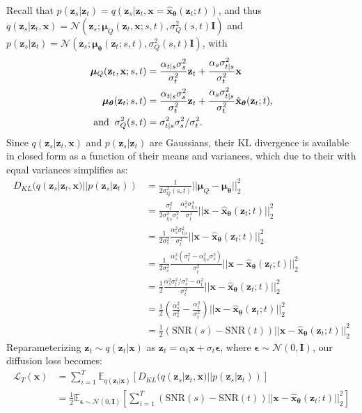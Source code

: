 \documentclass{article}
\def\rvx{{\mathbf{x}}}
\def\rvz{{\mathbf{z}}}
\newcommand{\E}{\mathbb{E}}
\newcommand{\bT}{{\boldsymbol{\theta}}}
\newcommand{\bfI}{\mathbf{I}}
\newcommand{\bepsilon}{{\boldsymbol{\epsilon}}}
\newcommand{\bmu}{{\boldsymbol{\mu}}}
\newcommand{\snr}{\text{SNR}}
\begin{document}
Recall that $p(\rvz_s|\rvz_t) = q(\rvz_s|\rvz_t, \rvx=\hat{\rvx}_{\bT}(\rvz_t; t))$, and thus $q(\rvz_s|\rvz_t,\rvx) = \mathcal{N}(\rvz_s; \bmu_{Q}(\rvz_{t}, \rvx; s,t), \sigma^2_Q(s,t) \bfI)$ and $p(\rvz_s|\rvz_t) = \mathcal{N}(\rvz_s; \bmu_{\bT}(\rvz_{t}; s, t), \sigma^2_Q(s,t) \bfI)$, with
\begin{align}
\bmu_{Q}(\rvz_t, \rvx; s, t) &= \frac{\alpha_{t|s}\sigma^{2}_s}{\sigma^{2}_t}\rvz_{t} + \frac{\alpha_s \sigma^{2}_{t|s}}{\sigma^{2}_{t}}\rvx\\
\bmu_{\bT}(\rvz_t; s, t) &= \frac{\alpha_{t|s}\sigma^{2}_s}{\sigma^{2}_t}\rvz_{t} + \frac{\alpha_s \sigma^{2}_{t|s}}{\sigma^{2}_{t}}\hat{\rvx}_{\bT}(\rvz_t; t),\\
\text{and\;\;} \sigma^2_Q(s,t) &= \sigma^2_{t|s}\sigma^2_s / \sigma^2_t.
\end{align}
Since $q(\rvz_s|\rvz_t,\rvx)$ and $p(\rvz_s|\rvz_t)$ are Gaussians, their KL divergence is available in closed form as a function of their means and variances, which due to their with equal variances simplifies as:
\begin{align}
D_{KL}(q(\rvz_s|\rvz_t,\rvx)||p(\rvz_s|\rvz_t)) 
&= \frac{1}{2\sigma^2_Q(s,t)}
||\bmu_Q - \bmu_\bT||_2^2
\label{eq:KL_DPM}
\\
&= 
\frac{\sigma^2_t}{2\sigma^2_{t|s}\sigma^2_s}
\frac{\alpha_s^{2} \sigma^{4}_{t|s}}{\sigma^{4}_{t}}
||\rvx - \hat{\rvx}_{\bT}(\rvz_t; t)||_2^2\\
&= 
\frac{1}{2\sigma^2_s}
\frac{\alpha_s^{2} \sigma^{2}_{t|s}}{\sigma^{2}_{t}}
||\rvx - \hat{\rvx}_{\bT}(\rvz_t; t)||_2^2\\
&= 
\frac{1}{2\sigma^2_s}
\frac{\alpha_s^{2}(\sigma^{2}_t - \alpha_{t|s}^{2}\sigma^{2}_s)}{\sigma^{2}_{t}}
||\rvx - \hat{\rvx}_{\bT}(\rvz_t; t)||_2^2\\
&= 
\frac{1}{2}
\frac{\alpha_s^{2}\sigma^{2}_t/\sigma^2_s - \alpha_{t}^{2}}{\sigma^{2}_{t}}
||\rvx - \hat{\rvx}_{\bT}(\rvz_t; t)||_2^2\\
&= 
\frac{1}{2}\left(
\frac{\alpha_s^{2}}{\sigma^2_s} - \frac{\alpha_t^{2}}{\sigma^{2}_t}\right)
||\rvx - \hat{\rvx}_{\bT}(\rvz_t; t)||_2^2\\
&= 
\frac{1}{2}\left(
\snr(s) - \snr(t)\right)
||\rvx - \hat{\rvx}_{\bT}(\rvz_t; t)||_2^2
\end{align}
Reparameterizing $\rvz_t \sim q(\rvz_t|\rvx)$ as $\rvz_t = \alpha_t \rvx + \sigma_t \bepsilon$, where $\bepsilon \sim \mathcal{N}(0,\bfI)$, our diffusion loss becomes:
\begin{align}
\mathcal{L}_T(\rvx) &= \sum_{i=1}^T \E_{q(\rvz_t|\rvx)}[ D_{KL}(q(\rvz_s|\rvz_t,\rvx)||p(\rvz_s|\rvz_t))]\\
&= \frac{1}{2}\E_{\bepsilon \sim \mathcal{N}(0,\bfI)}[\sum_{i=1}^T
\left(
\snr(s) - \snr(t)\right)
||\rvx - \hat{\rvx}_{\bT}(\rvz_t; t)||_2^2]
\end{align}
\end{document}
